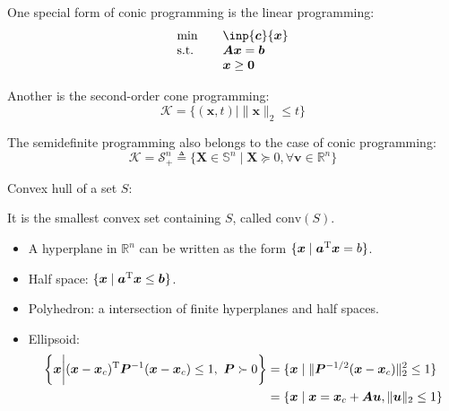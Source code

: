 One special form of conic programming is the linear programming:
\[
\begin{array}{ll}
\min&\quad\inp{\bm c}{\bm x}\\
\mbox{s.t.}&\quad \bm{Ax}=\bm b\\
&\quad \bm x\ge\bm0
\end{array}
\]

Another is the second-order cone programming:
\[
\mathcal{K} = \{(\bm x,t)\mid \|\bm x\|_2\le t\}
\]

The semidefinite programming also belongs to the case of conic programming:
\[
\mathcal{K}=\mathcal{S}_+^n
\triangleq
\{
\bm X\in\mathbb{S}^n\mid
\bm X\succeq0,\forall \bm v\in\mathbb{R}^n
\}
\]

Convex hull of a set $S$:

It is the smallest convex set containing $S$, called $\text{conv}(S)$.

\begin{definition}[Polyhedron]
\begin{itemize}
\item
A hyperplane in $\mathbb{R}^n$ can be written as the form $\{\bm x\mid\bm a^{\mathrm T}\bm x=b\}$.
\item
Half space: $\{\bm x\mid\bm a^{\mathrm T}\bm x\le\bm b\}$.
\item
Polyhedron: a intersection of finite hyperplanes and half spaces.
\item
Ellipsoid:
\begin{align*}
\bigg\{
\bm x
\bigg|
(\bm x - \bm x_c)^{\mathrm T}
\bm P^{-1}
(\bm x - \bm x_c)\le 1,~
\bm P\succ0
\bigg\}
&=
\{\bm x\mid \|\bm P^{-1/2}(\bm x- \bm x_c)\|_2^2\le 1\}\\
&=
\{\bm x\mid 
\bm x = \bm x_c + \bm A\bm u,
\|\bm u\|_2\le 1
\}
\end{align*}

\end{itemize}
\end{definition}







